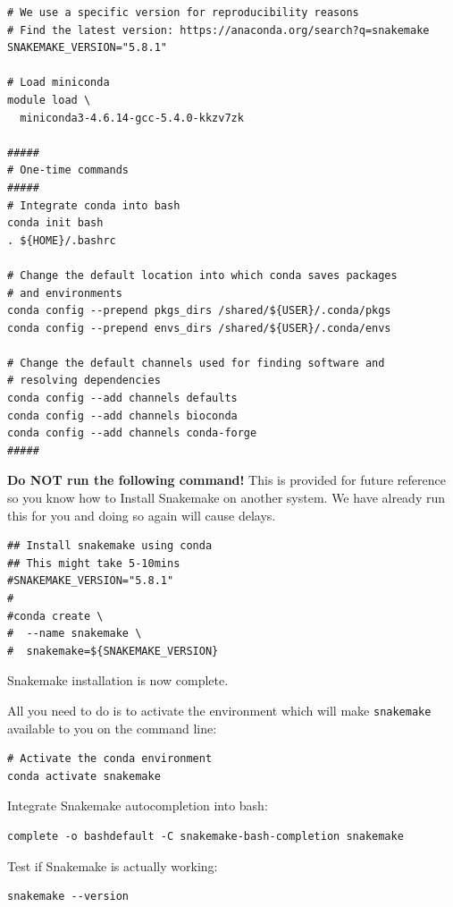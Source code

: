 \begin{steps}
\begin{lstlisting}
# We use a specific version for reproducibility reasons
# Find the latest version: https://anaconda.org/search?q=snakemake
SNAKEMAKE_VERSION="5.8.1"

# Load miniconda
module load \
  miniconda3-4.6.14-gcc-5.4.0-kkzv7zk

#####
# One-time commands
#####
# Integrate conda into bash
conda init bash
. ${HOME}/.bashrc

# Change the default location into which conda saves packages
# and environments
conda config --prepend pkgs_dirs /shared/${USER}/.conda/pkgs
conda config --prepend envs_dirs /shared/${USER}/.conda/envs

# Change the default channels used for finding software and
# resolving dependencies
conda config --add channels defaults
conda config --add channels bioconda
conda config --add channels conda-forge
#####
\end{lstlisting}

\end{steps}

\begin{warning}

\textbf{Do NOT run the following command!}
This is provided for future reference so you know how to Install Snakemake on another system.
We have already run this for you and doing so again will cause delays.

\begin{lstlisting}
## Install snakemake using conda
## This might take 5-10mins
#SNAKEMAKE_VERSION="5.8.1"
#
#conda create \
#  --name snakemake \
#  snakemake=${SNAKEMAKE_VERSION}
\end{lstlisting}

Snakemake installation is now complete.

\end{warning}

\begin{steps}

All you need to do is to activate the environment which will make \texttt{snakemake} available to you on the command line:

\begin{lstlisting}
# Activate the conda environment
conda activate snakemake
\end{lstlisting}

Integrate Snakemake autocompletion into bash:

\begin{lstlisting}
complete -o bashdefault -C snakemake-bash-completion snakemake
\end{lstlisting}

Test if Snakemake is actually working:

\begin{lstlisting}
snakemake --version
\end{lstlisting}

\end{steps}


